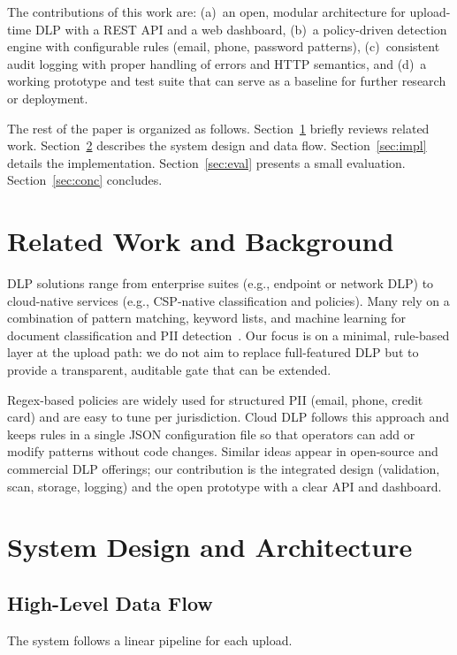\documentclass[11pt,a4paper]{article}
\begin{document}
The contributions of this work are: (a)~an open, modular architecture for upload-time DLP with a REST API and a web dashboard, (b)~a policy-driven detection engine with configurable rules (email, phone, password patterns), (c)~consistent audit logging with proper handling of errors and HTTP semantics, and (d)~a working prototype and test suite that can serve as a baseline for further research or deployment.

The rest of the paper is organized as follows. Section~\ref{sec:related} briefly reviews related work. Section~\ref{sec:design} describes the system design and data flow. Section~\ref{sec:impl} details the implementation. Section~\ref{sec:eval} presents a small evaluation. Section~\ref{sec:conc} concludes.

\section{Related Work and Background}
\label{sec:related}

DLP solutions range from enterprise suites (e.g., endpoint or network DLP) to cloud-native services (e.g., CSP-native classification and policies). Many rely on a combination of pattern matching, keyword lists, and machine learning for document classification and PII detection~\cite{b1,b2}. Our focus is on a minimal, rule-based layer at the upload path: we do not aim to replace full-featured DLP but to provide a transparent, auditable gate that can be extended.

Regex-based policies are widely used for structured PII (email, phone, credit card) and are easy to tune per jurisdiction. Cloud DLP follows this approach and keeps rules in a single JSON configuration file so that operators can add or modify patterns without code changes. Similar ideas appear in open-source and commercial DLP offerings; our contribution is the integrated design (validation, scan, storage, logging) and the open prototype with a clear API and dashboard.

\section{System Design and Architecture}
\label{sec:design}

\subsection{High-Level Data Flow}

The system follows a linear pipeline for each upload.
\end{document}
